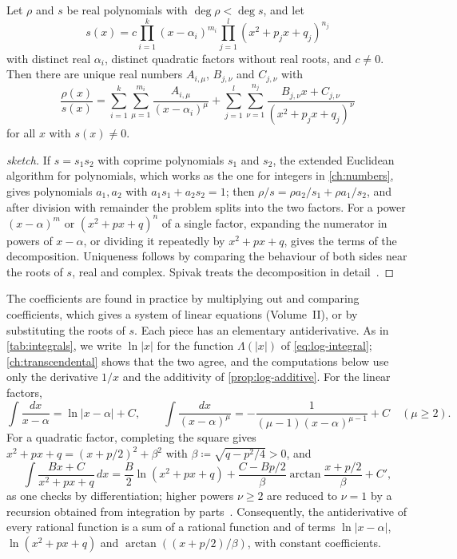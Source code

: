 \begin{theorem}
\label{thm:partial-fractions}
Let $\rho$ and $s$ be real polynomials with $\deg\rho<\deg s$, and let
\[
s(x)=c\prod_{i=1}^k(x-\alpha_i)^{m_i}\prod_{j=1}^l(x^2+p_jx+q_j)^{n_j}
\]
with distinct real $\alpha_i$, distinct quadratic factors without real roots, and $c\ne0$. Then there are unique real numbers $A_{i,\mu}$, $B_{j,\nu}$ and $C_{j,\nu}$ with
\[
\frac{\rho(x)}{s(x)}=\sum_{i=1}^k\sum_{\mu=1}^{m_i}\frac{A_{i,\mu}}{(x-\alpha_i)^\mu}+\sum_{j=1}^l\sum_{\nu=1}^{n_j}\frac{B_{j,\nu}x+C_{j,\nu}}{(x^2+p_jx+q_j)^\nu}
\]
for all $x$ with $s(x)\ne0$.
\end{theorem}

\begin{proof}[sketch]
If $s=s_1s_2$ with coprime polynomials $s_1$ and $s_2$, the extended Euclidean algorithm for polynomials, which works as the one for integers in \cref{ch:numbers}, gives polynomials $a_1,a_2$ with $a_1s_1+a_2s_2=1$; then $\rho/s=\rho a_2/s_1+\rho a_1/s_2$, and after division with remainder the problem splits into the two factors. For a power $(x-\alpha)^m$ or $(x^2+px+q)^n$ of a single factor, expanding the numerator in powers of $x-\alpha$, or dividing it repeatedly by $x^2+px+q$, gives the terms of the decomposition. Uniqueness follows by comparing the behaviour of both sides near the roots of $s$, real and complex. Spivak treats the decomposition in detail~\cite{spivak2008calculus}.
\end{proof}

The coefficients are found in practice by multiplying out and comparing coefficients, which gives a system of linear equations (Volume~II), or by substituting the roots of $s$. Each piece has an elementary antiderivative. As in \cref{tab:integrals}, we write $\ln|x|$ for the function $\Lambda(|x|)$ of \eqref{eq:log-integral}; \cref{ch:transcendental} shows that the two agree, and the computations below use only the derivative $1/x$ and the additivity of \cref{prop:log-additive}. For the linear factors,
\[
\int\frac{dx}{x-\alpha}=\ln|x-\alpha|+C,\qquad\int\frac{dx}{(x-\alpha)^\mu}=-\frac1{(\mu-1)(x-\alpha)^{\mu-1}}+C\quad(\mu\ge2).
\]
For a quadratic factor, completing the square gives $x^2+px+q=(x+p/2)^2+\beta^2$ with $\beta\coloneqq\sqrt{q-p^2/4}>0$, and
\[
\int\frac{Bx+C}{x^2+px+q}\,dx=\frac B2\ln(x^2+px+q)+\frac{C-Bp/2}\beta\arctan\frac{x+p/2}\beta+C' ,
\]
as one checks by differentiation; higher powers $\nu\ge2$ are reduced to $\nu=1$ by a recursion obtained from integration by parts~\cite{spivak2008calculus}. Consequently, the antiderivative of every rational function is a sum of a rational function and of terms $\ln|x-\alpha|$, $\ln(x^2+px+q)$ and $\arctan((x+p/2)/\beta)$, with constant coefficients.

